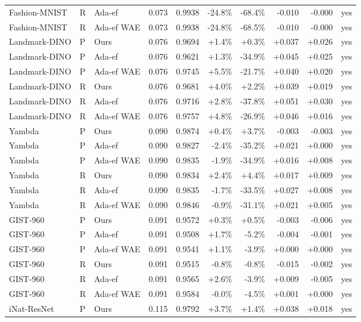 \begin{tabular}{lllrrrrrrl}
Fashion-MNIST & R & Ada-ef & 0.073 & 0.9938 & -24.8\% & -68.4\% & -0.010 & -0.000 & yes \\
Fashion-MNIST & R & Ada-ef WAE & 0.073 & 0.9938 & -24.8\% & -68.5\% & -0.010 & -0.000 & yes \\
Landmark-DINO & P & Ours & 0.076 & 0.9694 & +1.4\% & +0.3\% & +0.037 & +0.026 & yes \\
Landmark-DINO & P & Ada-ef & 0.076 & 0.9621 & +1.3\% & -34.9\% & +0.045 & +0.025 & yes \\
Landmark-DINO & P & Ada-ef WAE & 0.076 & 0.9745 & +5.5\% & -21.7\% & +0.040 & +0.020 & yes \\
Landmark-DINO & R & Ours & 0.076 & 0.9681 & +4.0\% & +2.2\% & +0.039 & +0.019 & yes \\
Landmark-DINO & R & Ada-ef & 0.076 & 0.9716 & +2.8\% & -37.8\% & +0.051 & +0.030 & yes \\
Landmark-DINO & R & Ada-ef WAE & 0.076 & 0.9757 & +4.8\% & -26.9\% & +0.046 & +0.016 & yes \\
Yambda & P & Ours & 0.090 & 0.9874 & +0.4\% & +3.7\% & -0.003 & -0.003 & yes \\
Yambda & P & Ada-ef & 0.090 & 0.9827 & -2.4\% & -35.2\% & +0.021 & +0.000 & yes \\
Yambda & P & Ada-ef WAE & 0.090 & 0.9835 & -1.9\% & -34.9\% & +0.016 & +0.008 & yes \\
Yambda & R & Ours & 0.090 & 0.9834 & +2.4\% & +4.4\% & +0.017 & +0.009 & yes \\
Yambda & R & Ada-ef & 0.090 & 0.9835 & -1.7\% & -33.5\% & +0.027 & +0.008 & yes \\
Yambda & R & Ada-ef WAE & 0.090 & 0.9846 & -0.9\% & -31.1\% & +0.021 & +0.005 & yes \\
GIST-960 & P & Ours & 0.091 & 0.9572 & +0.3\% & +0.5\% & -0.003 & -0.006 & yes \\
GIST-960 & P & Ada-ef & 0.091 & 0.9508 & +1.7\% & -5.2\% & -0.004 & -0.001 & yes \\
GIST-960 & P & Ada-ef WAE & 0.091 & 0.9541 & +1.1\% & -3.9\% & +0.000 & +0.000 & yes \\
GIST-960 & R & Ours & 0.091 & 0.9515 & -0.8\% & -0.8\% & -0.015 & -0.002 & yes \\
GIST-960 & R & Ada-ef & 0.091 & 0.9565 & +2.6\% & -3.9\% & +0.009 & -0.005 & yes \\
GIST-960 & R & Ada-ef WAE & 0.091 & 0.9584 & -0.0\% & -4.5\% & +0.001 & +0.000 & yes \\
iNat-ResNet & P & Ours & 0.115 & 0.9792 & +3.7\% & +1.4\% & +0.038 & +0.018 & yes \\

\end{tabular}
